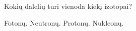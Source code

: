 \question Kokių dalelių turi vienoda kiekį izotopai? \begin{choices}
    \choice Fotonų.
    \choice Neutronų.
    \choice Protonų.
    \choice Nukleonų.
\end{choices}